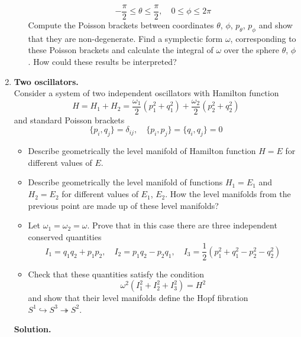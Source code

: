\documentclass[12pt]{article}
\theoremstyle{definition}
\begin{document}
\begin{enumerate}
\begin{itemize}
\begin{equation}
        \end{equation}
        \begin{equation}
            -\frac{\pi}{2}\leq\theta\leq\frac{\pi}{2},\quad0\leq\phi\leq2\pi
        \end{equation}
        Compute the Poisson brackets between coordinates $\theta$, $\phi$, $p_\theta$, $p_\phi$ and show that they are non-degenerate. Find a symplectic form $\omega$, corresponding to these Poisson brackets and calculate the integral of $\omega$ over the sphere $\theta$, $\phi$. How could these results be interpreted?
    \end{itemize}
    \item \textbf{Two oscillators.}\\
    Consider a system of two independent oscillators with Hamilton function
    \begin{equation}
        H=H_1+H_2=\frac{\omega_1}{2}(p_1^2+q_1^2)+\frac{\omega_2}{2}(p_2^2+q_2^2)
    \end{equation}
    and standard Poisson brackets
    \begin{equation}
        \{p_i,q_j\}=\delta_{ij},\quad \{p_i,p_j\}=\{q_i,q_j\}=0
    \end{equation}
    \begin{itemize}
        \item Describe geometrically the level manifold of Hamilton function $H=E$ for different values of $E$.
        \item Describe geometrically the level manifold of functions $H_1=E_1$ and $H_2=E_2$ for different values of $E_1$, $E_2$. How the level manifolds from the previous point are made up of these level manifolds?
        \item Let $\omega_1=\omega_2=\omega$. Prove that in this case there are three independent conserved quantities
        \begin{equation}
            I_1=q_1q_2+p_1p_2,\quad I_2=p_1q_2-p_2q_1,\quad I_3=\frac{1}{2}(p_1^2+q_1^2-p_2^2-q_2^2)
        \end{equation}
        \item Check that these quantities satisfy the condition
        \begin{equation}
            \omega^2(I_1^2+I_2^2+I_3^2)=H^2
        \end{equation}
        and show that their level manifolds define the Hopf fibration $S^1\hookrightarrow S^3\twoheadrightarrow S^2$.
    \end{itemize}
    \textbf{Solution.}
    \begin{itemize}

\end{itemize}
\end{enumerate}
\end{document}

